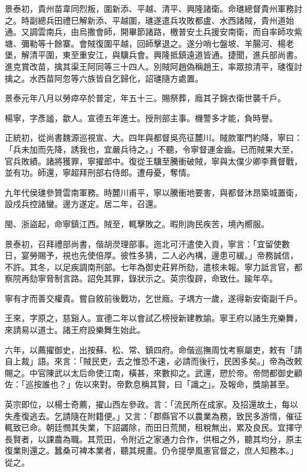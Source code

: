 \begin{pinyinscope}
景泰初，貴州苗韋同烈叛，圍新添、平越、清平、興隆諸衛。命璡總督貴州軍務討之。時副總兵田禮巳解新添、平越圍，璡遂遣兵攻敗都盧、水西諸賊，貴州道始通。又調雲南兵，由烏撒會師，開畢節諸路，檄普安土兵援安南衛，而自率師攻紫塘、彌勒等十餘寨。會賊復圍平越，回師擊退之。遂分哨七盤坡、羊腸河、楊老堡，解清平圍，東至重安江，與驥兵會。興隆抵鎮遠道皆通。捷聞，進兵部尚書。進克賞改苗，擒其渠王阿同等三十四人。別賊阿趙偽稱趙王，率眾掠清平，璡復討擒之。水西苗阿忽等六族皆自乞歸化，詔璡隨方處置。

景泰元年八月以勞瘁卒於普定，年五十三。賜祭葬，廕其子錦衣衛世襲千戶。

楊寧，字彥謐，歙人。宣德五年進士。授刑部主事。機警多才能，負時譽。

正統初，從尚書魏源巡視宣、大。四年與都督吳亮征麓川。賊款軍門約降，寧曰：「兵未加而先降，誘我也，宜嚴兵待之。」不聽，令寧督運金齒。已而賊果大至，官兵敗績。諸將獲罪，寧擢郎中。復從王驥至騰衝破賊，寧與太僕少卿李蕡督戰，並有功。師還，寧超拜刑部右侍郎。遭母憂，奪情。

九年代侯璡參贊雲南軍務。時麓川甫平，寧以騰衝地要害，與都督沐昂築城置衛，設戍兵控諸蠻。邊方遂定。居二年，召還。

閩、浙盜起，命寧鎮江西。賊至，輒擊敗之。暇則詢民疾苦，境內嚮服。

景泰初，召拜禮部尚書，偕胡濙理部事。迤北可汗遣使入貢，寧言：「宜留使數日，宴勞賜予，視也先使倍厚。彼性多猜，二人必內構，邊患可緩。」帝務誠信，不許。其冬，以足疾調南刑部。七年為御史莊昇所劾，遣核未報。寧力詆言官，都察院再劾寧脅制言路。詔免其罪，錄狀示之。英宗復辟，命致仕。踰年卒。

寧有才而善交權貴。嘗自敘前後戰功，乞世廕。子堣方一歲，遂得新安衛副千戶。

王來，字原之，慈谿人。宣德二年以會試乙榜授新建教諭。寧王府以諸生充樂舞，來請易以道士。諸王府設樂舞生始此。

六年，以薦擢御史，出按蘇、松、常、鎮四府。命偕巡撫周忱考察屬吏，敕有「請自上裁」語。來言：「賊民吏，去之惟恐不速，必請而後行，民困多矣。」帝為改敕賜之。中官陳武以太后命使江南，橫甚，來數抑之。武還，愬於帝。帝問都御史顧佐：「巡按誰也？」佐以來對。帝歎息稱其賢，曰「識之」。及報命，獎諭甚至。

英宗即位，以楊士奇薦，擢山西左參政。言：「流民所在成家。及招還故土，每以失產復逃去。乞請隨在附籍便。」又言：「郡縣官不以農業為務，致民多游惰，催征輒致已命。朝廷憫其失業，下詔蠲除，而田日荒閒，租稅無出，累及良民。宜擇守長賢者，以課農為職。其荒田，令附近之家通力合作，供租之外，聽其均分，原主復業則還之。蠶桑可裨本業者，聽其規畫。仍令提學風憲官督之，庶人知務本。」從之。


\end{pinyinscope}
